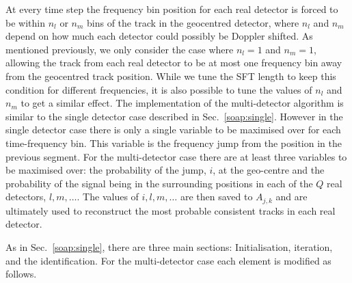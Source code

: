 %
%
At every time step the frequency bin position for each real detector is forced to be within $n_l$ or $n_m$ bins of the track in the geocentred detector, where $n_l$ and $n_m$ depend on how much each detector could possibly be Doppler shifted. As mentioned previously, we only consider the case where $n_l=1$ and $n_m = 1$,  allowing the track from each real detector to be at most one frequency bin away from the geocentred track position. While we tune the \gls{SFT} length to keep this condition for different frequencies, it is also possible to tune the values of $n_l$ and $n_m$ to get a similar effect.
%
%
The implementation of the multi-detector algorithm is similar to the single detector case described in Sec.~\ref{soap:single}.  However in the single detector case there is only a single variable to be maximised over for each time-frequency bin. This variable is the frequency jump from the position in the previous segment. For the multi-detector case there are at least three variables to be maximised over: the probability of the jump, $i$, at the geo-centre and the probability of the signal being in the surrounding positions in each of the $Q$ real detectors, $l,m,\dots$. The values of $i,l,m, \dots$ are then saved to $A_{j,k}$ and are ultimately used to reconstruct the most probable consistent tracks in each real detector.

%
%
As in Sec.~\ref{soap:single}, there are three main sections: Initialisation, iteration, and the identification. For the multi-detector case each element is modified as follows.

